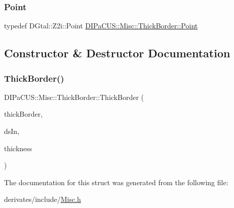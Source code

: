 \subsubsection{\texorpdfstring{Point}{Point}}
{\footnotesize\ttfamily typedef D\+Gtal\+::\+Z2i\+::\+Point \mbox{\hyperlink{structDIPaCUS_1_1Misc_1_1ThickBorder_ae295c13d112a91997154ec08edcbd01d}{D\+I\+Pa\+C\+U\+S\+::\+Misc\+::\+Thick\+Border\+::\+Point}}}



\subsection{Constructor \& Destructor Documentation}
\mbox{\label{structDIPaCUS_1_1Misc_1_1ThickBorder_aab612b502416009a6ae33d36830de1d6}} 
\subsubsection{\texorpdfstring{Thick\+Border()}{ThickBorder()}}
{\footnotesize\ttfamily D\+I\+Pa\+C\+U\+S\+::\+Misc\+::\+Thick\+Border\+::\+Thick\+Border (\begin{DoxyParamCaption}\item[{\mbox{\hyperlink{structDIPaCUS_1_1Misc_1_1ThickBorder_a0fc2e5498fb6c524bebb4965338a9189}{Digital\+Set}} \&}]{thick\+Border,  }\item[{const \mbox{\hyperlink{structDIPaCUS_1_1Misc_1_1ThickBorder_a0fc2e5498fb6c524bebb4965338a9189}{Digital\+Set}} \&}]{ds\+In,  }\item[{int}]{thickness }\end{DoxyParamCaption})\hspace{0.3cm}{\ttfamily [inline]}}



The documentation for this struct was generated from the following file\+:\begin{DoxyCompactItemize}
\item 
derivates/include/\mbox{\hyperlink{Misc_8h}{Misc.\+h}}\end{DoxyCompactItemize}
